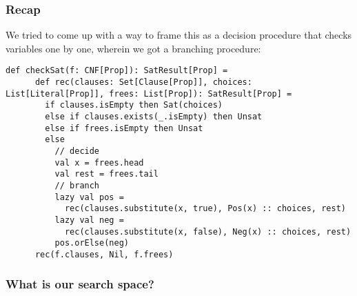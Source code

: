 \documentclass[
  aspectratio=1610, 
  xcolor={dvipsnames},
]{beamer}
\begin{document}
\begin{frame}[fragile]
  \frametitle{Recap}

  We tried to come up with a way to frame this as a decision procedure that
  checks variables one by one, wherein we got a branching procedure:
  
  \begin{lstlisting}[basicstyle=\ttfamily\scriptsize]
    def checkSat(f: CNF[Prop]): SatResult[Prop] =
      def rec(clauses: Set[Clause[Prop]], choices: List[Literal[Prop]], frees: List[Prop]): SatResult[Prop] =
        if clauses.isEmpty then Sat(choices)
        else if clauses.exists(_.isEmpty) then Unsat
        else if frees.isEmpty then Unsat
        else
          // decide
          val x = frees.head
          val rest = frees.tail
          // branch
          lazy val pos = 
            rec(clauses.substitute(x, true), Pos(x) :: choices, rest)
          lazy val neg = 
            rec(clauses.substitute(x, false), Neg(x) :: choices, rest)
          pos.orElse(neg)
      rec(f.clauses, Nil, f.frees)
  \end{lstlisting}

\end{frame}

\begin{frame}
  \frametitle{What is our search space?}



  


\end{frame}
\end{document}
